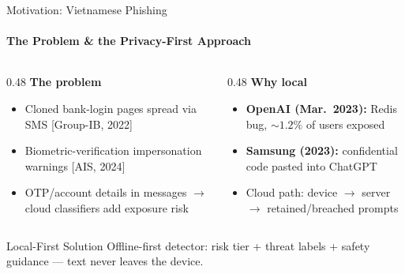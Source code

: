 \begin{frame}{Motivation: Vietnamese Phishing}
  \framesubtitle{The Problem \& the Privacy-First Approach}
  \begin{columns}[T,onlytextwidth]
    \begin{column}{0.48\textwidth}
      {\footnotesize\textbf{The problem}}\\[2pt]
      \begin{itemize}\footnotesize
        \item Cloned bank-login pages spread via SMS {\scriptsize [Group-IB, 2022]}
        \item Biometric-verification impersonation warnings {\scriptsize [AIS, 2024]}
        \item OTP/account details in messages $\to$ cloud classifiers add exposure risk
      \end{itemize}
    \end{column}
    \begin{column}{0.48\textwidth}
      {\footnotesize\textbf{Why local}}\\[2pt]
      \begin{itemize}\footnotesize
        \item \textbf{OpenAI (Mar.\ 2023):} Redis bug, ${\sim}1.2\%$ of users exposed
        \item \textbf{Samsung (2023):} confidential code pasted into ChatGPT
        \item Cloud path: device $\to$ server $\to$ retained/breached prompts
      \end{itemize}
    \end{column}
  \end{columns}
  \vfill
  \begin{block}{Local-First Solution}
    {\footnotesize Offline-first detector: risk tier + threat labels + safety guidance --- text never leaves the device.}
  \end{block}
\end{frame}
